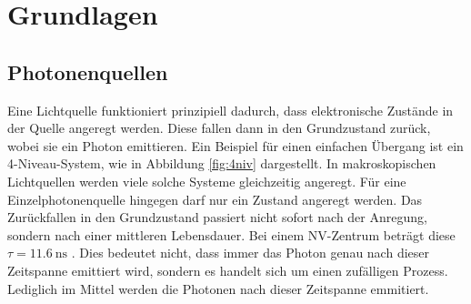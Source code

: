 \section{Grundlagen}
\subsection{Photonenquellen}\label{sec:Photonenquellen}
Eine Lichtquelle funktioniert prinzipiell dadurch, dass elektronische Zust\"ande in der Quelle angeregt werden.
Diese fallen dann in den Grundzustand zur\"uck, wobei sie ein Photon emittieren.
Ein Beispiel f\"ur einen einfachen \"Ubergang ist ein 4-Niveau-System, wie in Abbildung \vref{fig:4niv} dargestellt.
In makroskopischen Lichtquellen werden viele solche Systeme gleichzeitig angeregt.
F\"ur eine Einzelphotonenquelle hingegen darf nur ein Zustand angeregt werden. 
Das Zurückfallen in den Grundzustand passiert nicht sofort nach der Anregung, sondern nach einer mittleren Lebensdauer. Bei einem NV-Zentrum beträgt diese $\tau = 11.6\ \mathrm{ns}$ \cite{brouri}. Dies bedeutet nicht, dass immer das Photon genau nach dieser Zeitspanne emittiert wird, sondern es handelt sich um einen zufälligen Prozess. Lediglich im Mittel werden die Photonen nach dieser Zeitspanne emmitiert. 


